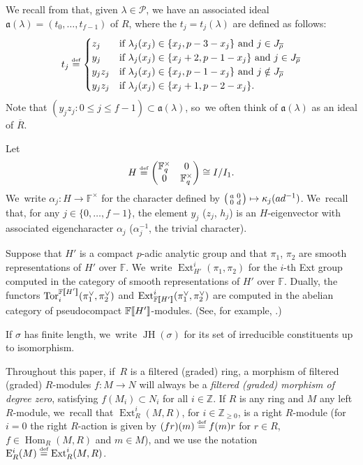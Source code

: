 \documentclass[JEP,XML,SOM,Unicode,NoFloatCountersInSection, NoEqCountersInSection,published]{cedram}
\newenvironment{smallpmatrix}{\big(\begin{smallmatrix}}{\end{smallmatrix}\big)}
\newcommand\mto{\mathchoice{\longmapsto}{\mapsto}{\mapsto}{\mapsto}}
\let\ovl\overline
\newcommand{\defeq}{\stackrel{\textrm{\tiny{\upshape{def}}}}{=}}
\newcommand{\F}{\mathbb{F}}
\newcommand{\Z}{{\mathbb Z}}
\newcommand{\EE}{\mathrm{E}}
\newcommand{\fa}{\mathfrak{a}}
\newcommand{\brho}{\overline{\rho}}
\newcommand{\bbra}[1]{[\mkern-3mu[#1]\mkern-3mu]}
\DeclareMathOperator{\Ext}{Ext}
\DeclareMathOperator{\Hom}{Hom}
\DeclareMathOperator{\JH}{\mathrm{JH}}
\DeclareMathOperator{\Tor}{Tor}
\theoremstyle{plain}
\theoremstyle{definition}
\begin{document}
We recall from \cite[Def.\,3.57]{BHHMS2} that, given $\lambda\in\mathscr{P}$, we have an associated ideal $\mathfrak{a}(\lambda)=(t_0,\dots,t_{f-1})$ of $R$, where the $t_j = t_j(\lambda)$ are defined as follows:
\begin{equation}
\label{eq:id:al}
t_j\defeq \begin{cases}
z_j& \text{if } \lambda_j(x_j)\in\{x_j,p-3-x_j\} \ \text{and}\ j\in J_{\brho}\\
y_j& \text{if } \lambda_j(x_j)\in\{x_j+2,p-1-x_j\} \ \text{and}\ j\in J_{\brho}\\
y_jz_j & \text{if } \lambda_j(x_j)\in \{x_j,p-1-x_j\} \ \text{and}\ j\notin J_{\brho}\\
y_jz_j& \text{if } \lambda_j(x_j)\in \{x_j+1,p-2-x_j\}.\end{cases}
\end{equation}
Note that $(y_jz_j: 0 \le j \le f-1) \subset \fa(\lambda)$, so~we often think of $\fa(\lambda)$ as an ideal of $\ovl R$.

Let
\[
H\defeq \begin{pmatrix}\F_q^\times&0\\0&\F_q^\times\end{pmatrix}\cong I/I_1.
\]
We~write $\alpha_j:H\to\F^\times$ for the character defined by $\begin{smallpmatrix}a&0\\0&d\end{smallpmatrix}\mto \kappa_j(ad^{-1})$. We~recall that, for any $j\in\{0,\dots,f-1\}$, the element $y_j$ (\resp $z_j$, \resp $h_j$) is an $H$-eigenvector with associated eigencharacter $\alpha_j$ (\resp $\alpha_j^{-1}$, \resp the trivial character).

Suppose that $H'$ is a compact $p$-adic analytic group and that $\pi_1$, $\pi_2$ are smooth representations of $H'$ over $\F$. We~write $\Ext^i_{H'}(\pi_1,\pi_2)$ for the $i$-th Ext group computed in the category of smooth representations of $H'$ over $\F$.
Dually, the functors $\Tor_i^{\F\bbra{H'}}(\pi_1^\vee,\pi_2^\vee)$ and $\Ext^i_{\F\bbra{H'}}(\pi_1^\vee,\pi_2^\vee)$ are computed in the abelian category of pseudocompact $\F\bbra{H'}$-modules.
(See, for example, \cite[\S 2]{emerton-ordII}.)

If $\sigma$ has finite length, we~write $\JH(\sigma)$ for its set of irreducible constituents up to isomorphism.

Throughout this paper, if~$R$ is a filtered (\resp graded) ring, a morphism of filtered (\resp graded) $R$-modules $f:M\to N$ will always be a \emph{filtered (\resp graded) morphism of degree zero}, \ie satisfying $f(M_i)\subset N_i$ for all $i\in \Z$.
If $R$ is any ring and $M$ any left $R$-module, we~recall that $\Ext^{i}_R(M,R)$, for $i\in \Z_{\ge 0}$, is a right $R$-module (for $i=0$ the right $R$-action is given by $(f r)(m)\defeq f(m)r$ for $r\in R$, $f\in \Hom_R(M,R)$ and $m\in M$), and we use the notation $\EE^i_R(M)\defeq \Ext^{i}_R(M,R)$.
\end{document}
